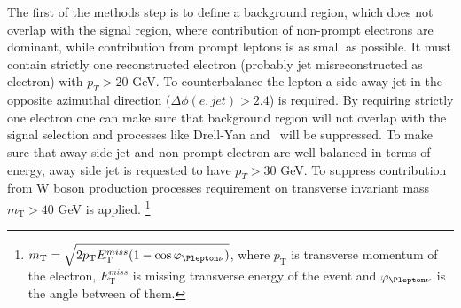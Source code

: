 The first of the methods step is to define a background region, which does not overlap with the signal region, where 
contribution of non-prompt electrons are dominant, while contribution from prompt leptons is as small as possible.
It must contain strictly one reconstructed electron (probably jet misreconstructed as electron) with $p_T > 20$ GeV.
To counterbalance the lepton a side away jet in the opposite azimuthal direction ($\Delta \phi (e,jet) > 2.4$) is required.
By requiring strictly one electron one can make sure that background region will not overlap with the signal selection and processes 
like Drell-Yan and \ttbar~will be suppressed.
To make sure that away side jet and non-prompt electron are well balanced in terms of energy, away side jet is
requested to have $p_T > 30$ GeV.
To suppress contribution from W boson production processes requirement on transverse invariant mass 
$m_\mathrm{T} > 40$ GeV is applied.
\footnote{$m_\mathrm{T} = \sqrt{2 p_\mathrm{T} E_\mathrm{T}^{miss} (1-\cos\varphi_{\Plepton\nu})}$, where
$p_\mathrm{T}$ is transverse momentum of the electron, $E_\mathrm{T}^{miss}$ is missing transverse energy of the event
and $\varphi_{\Plepton\nu}$ is the angle between of them.}

